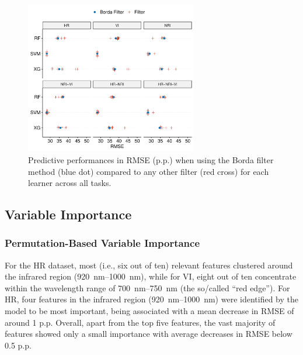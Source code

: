 \documentclass[remotesensing,article,accept,moreauthors,pdftex]{Definitions/mdpi}
\begin{document}
\begin{paracol}{2}
\begin{figure}[H]
		\includegraphics[width=0.67\textwidth] {filter-effect-all-vs-borda-filter-1.pdf}
		\caption{Predictive performances in RMSE (p.p.) when using the Borda filter method (blue dot) compared to any other filter (red cross) for each learner across all tasks.}\label{fig:filter-effects-borda}
\end{figure}

\subsection{Variable Importance}

\subsubsection*{Permutation-Based Variable Importance}


For the HR dataset, most (i.e., six out of ten) relevant features clustered around the infrared region (920~nm--1000~nm), while for VI, eight out of ten concentrate within the wavelength range of 700~nm--750~nm (the so\-/called \enquote{red edge}).
For HR, four features in the infrared region (920~nm--1000~nm) were identified by the model to be most important, being associated with a mean decrease in RMSE of around 1 p.p.
Overall, apart from the top five features, the vast majority of features showed only a small importance with average decreases in RMSE below 0.5 p.p.
\vspace{-10pt}

\end{paracol}
\end{document}
